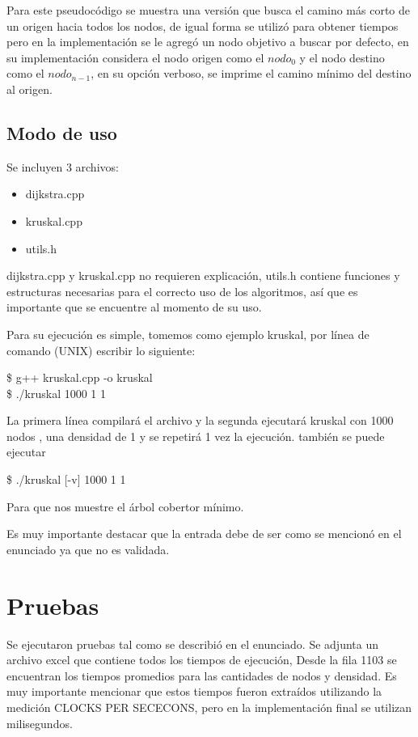 \documentclass[letterpaper,11pt]{article}
\begin{document}
        Para este pseudocódigo se muestra una versión que busca el camino más corto de un origen hacia todos los nodos, de igual forma se utilizó para obtener tiempos pero en la implementación se le agregó un nodo objetivo a buscar por defecto, en su implementación considera el nodo origen como el $nodo_0$ y el nodo destino como el $nodo_{n-1}$, en su opción verboso, se imprime el camino mínimo del destino al origen.

    \subsection{Modo de uso}
        Se incluyen 3 archivos:
        \begin{itemize}
            \item dijkstra.cpp
            \item kruskal.cpp
            \item utils.h
        \end{itemize}

        dijkstra.cpp y kruskal.cpp no requieren explicación, utils.h contiene funciones y estructuras necesarias para el correcto uso de los algoritmos, así que es importante que se encuentre al momento de su uso.

        Para su ejecución es simple, tomemos como ejemplo kruskal, por línea de comando (UNIX) escribir lo siguiente:
        
        \$ g++ kruskal.cpp -o kruskal\\
        \indent \$ ./kruskal 1000 1 1

        La primera línea compilará el archivo y la segunda ejecutará kruskal con 1000 nodos , una densidad de 1 y se repetirá 1 vez la ejecución. también se puede ejecutar
        
        \$ ./kruskal [-v] 1000 1 1

        Para que nos muestre el árbol cobertor mínimo.

        Es muy importante destacar que la entrada debe de ser como se mencionó en el enunciado ya que no es validada. 

\section{Pruebas}
        Se ejecutaron pruebas tal como se describió en el enunciado. Se adjunta un archivo excel que contiene todos los tiempos de ejecución, Desde la fila 1103 se encuentran los tiempos promedios para las cantidades de nodos y densidad. Es muy importante mencionar que estos tiempos fueron extraídos utilizando la medición CLOCKS PER SECECONS, pero en la implementación final se utilizan milisegundos.
        
\end{document}
